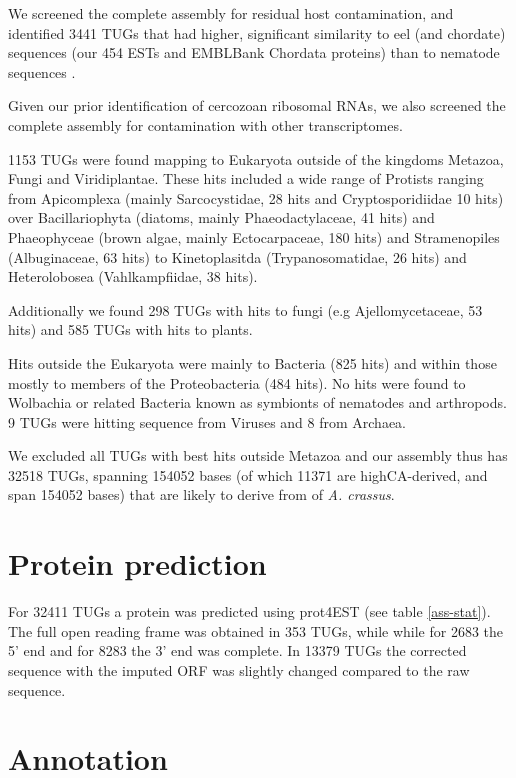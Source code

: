 \afterpage{\clearpage}

We screened the complete assembly for residual host contamination, and
identified 3441 TUGs that had higher, significant similarity to
eel (and chordate) sequences (our 454 ESTs and EMBLBank Chordata
proteins) than to nematode sequences \cite{pmid21550347}.

Given our prior identification of cercozoan ribosomal RNAs, we also
screened the complete assembly for contamination with other
transcriptomes.

1153 TUGs were found mapping to Eukaryota outside of the kingdoms
Metazoa, Fungi and Viridiplantae. These hits included a wide range of
Protists ranging from Apicomplexa (mainly Sarcocystidae, 28 hits and
Cryptosporidiidae 10 hits) over Bacillariophyta (diatoms, mainly
Phaeodactylaceae, 41 hits) and Phaeophyceae (brown algae, mainly
Ectocarpaceae, 180 hits) and Stramenopiles (Albuginaceae, 63 hits) to
Kinetoplasitda (Trypanosomatidae, 26 hits) and Heterolobosea
(Vahlkampfiidae, 38 hits).

Additionally we found 298 TUGs with hits to fungi (e.g
Ajellomycetaceae, 53 hits) and 585 TUGs with hits to plants.

Hits outside the Eukaryota were mainly to Bacteria (825 hits) and
within those mostly to members of the Proteobacteria (484 hits). No
hits were found to Wolbachia or related Bacteria known as symbionts of
nematodes and arthropods. 9 TUGs were hitting sequence from Viruses
and 8 from Archaea.

We excluded all TUGs with best hits outside Metazoa and our assembly
thus has 32518 TUGs, spanning 154052 bases (of which 11371 are
highCA-derived, and span 154052 bases) that are likely to derive from
of \textit{A. crassus}.

\section{Protein prediction}

For 32411 TUGs a protein was predicted using prot4EST
\cite{wasmuth_prot4est:_2004} (see table \ref{ass-stat}). The full
open reading frame was obtained in 353 TUGs, while while for 2683 the
5' end and for 8283 the 3' end was complete. In 13379 TUGs the
corrected sequence with the imputed ORF was slightly changed compared
to the raw sequence.

\section{Annotation}
\label{454-annot}

